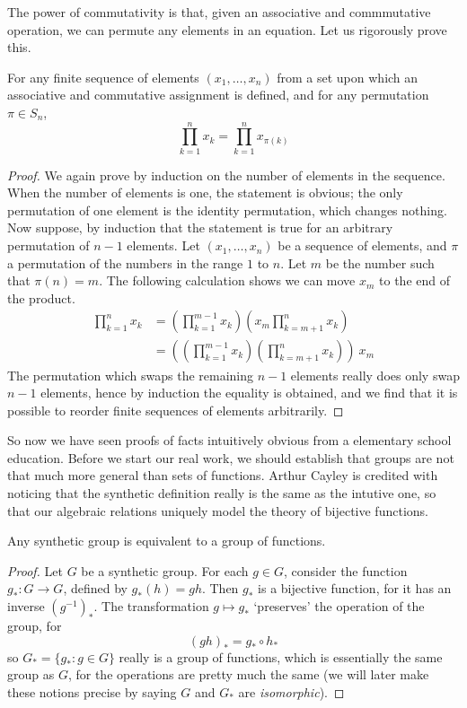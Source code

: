 The power of commutativity is that, given an associative and commmutative operation, we can permute any elements in an equation. Let us rigorously prove this.

\begin{theorem}
    For any finite sequence of elements $(x_1, \dots, x_n)$ from a set upon which an associative and commutative assignment is defined, and for any permutation $\pi \in S_n$,
    \[ \prod_{k=1}^n x_k = \prod_{k=1}^n x_{\pi(k)} \]
\end{theorem}
\begin{proof}
    We again prove by induction on the number of elements in the sequence. When the number of elements is one, the statement is obvious; the only permutation of one element is the identity permutation, which changes nothing. Now suppose, by induction that the statement is true for an arbitrary permutation of $n-1$ elements. Let $(x_1, \dots, x_n)$ be a sequence of elements, and $\pi$ a permutation of the numbers in the range $1$ to $n$. Let $m$ be the number such that $\pi(n) = m$. The following calculation shows we can move $x_m$ to the end of the product.
    \begin{align}
    \prod_{k=1}^n x_k &= \left( \prod_{k=1}^{m-1} x_k \right) \left( x_m \prod_{k=m+1}^n x_k \right)\\
    &= \left( \left( \prod_{k=1}^{m-1} x_k \right) \left( \prod_{k=m+1}^n x_k \right) \right)\ x_m
    \end{align}
    The permutation which swaps the remaining $n-1$ elements really does only swap $n-1$ elements, hence by induction the equality is obtained, and we find that it is possible to reorder finite sequences of elements arbitrarily.
\end{proof}

So now we have seen proofs of facts intuitively obvious from a elementary school education. Before we start our real work, we should establish that groups are not that much more general than sets of functions. Arthur Cayley is credited with noticing that the synthetic definition really is the same as the intutive one, so that our algebraic relations uniquely model the theory of bijective functions.

\begin{theorem}
    Any synthetic group is equivalent to a group of functions.
\end{theorem}
\begin{proof}
    Let $G$ be a synthetic group. For each $g \in G$, consider the function $g_*:G \to G$, defined by $g_*(h) = gh$. Then $g_*$ is a bijective function, for it has an inverse $(g^{-1})_*$. The transformation $g \mapsto g_*$ `preserves' the operation of the group, for
    \[ (gh)_* = g_* \circ h_* \]
    so $G_* = \{ g_* : g \in G \}$ really is a group of functions, which is essentially the same group as $G$, for the operations are pretty much the same (we will later make these notions precise by saying $G$ and $G_*$ are {\it isomorphic}).
\end{proof}

